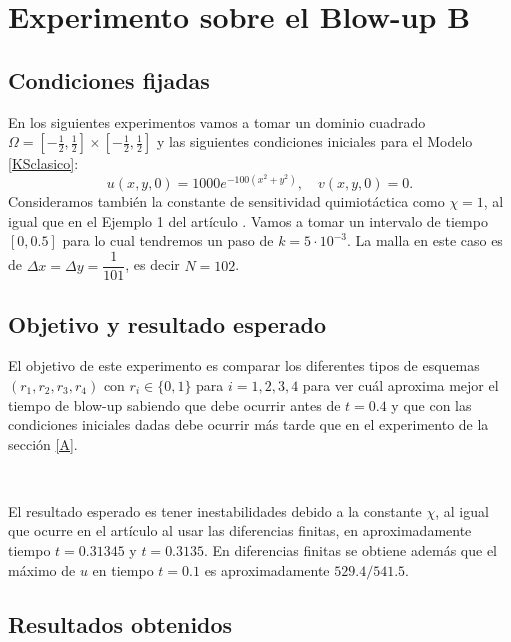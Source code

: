 \documentclass[a4paper,12pt]{article}
\begin{document}
\section{Experimento sobre el Blow-up B}
\subsection{Condiciones fijadas}
En los siguientes experimentos vamos a tomar un dominio cuadrado $\Omega=[-\frac{1}{2},\frac{1}{2}]\times[-\frac{1}{2},\frac{1}{2}]$ y las siguientes condiciones iniciales para el Modelo \ref{KSclasico}:
\begin{equation}
u(x,y,0)=1000e^{-100(x^2+y^2)}, \quad v(x,y,0)=0.
\end{equation}
Consideramos también la constante de sensitividad quimiotáctica como $\chi=1$, al igual que en el Ejemplo 1 del artículo \cite{bib:2}. Vamos a tomar un intervalo de tiempo $[0,0.5]$ para lo cual tendremos un paso de $k=5\cdot 10^{-3}$. 
La malla en este caso es de $\Delta x=\Delta y=\dfrac{1}{101}$, es decir $N=102$. 
\subsection{Objetivo y resultado esperado}
El objetivo de este experimento es comparar los diferentes tipos de esquemas $(r_1,r_2,r_3,r_4)$ con $r_i\in\{0,1\}$ para $i=1,2,3,4$ para ver cuál aproxima mejor el tiempo de blow-up sabiendo que debe ocurrir antes de $t=0.4$ y que con las condiciones iniciales dadas debe ocurrir más tarde que en el experimento de la sección \ref{A}.

\ 

El resultado esperado es tener inestabilidades debido a la constante $\chi$, al igual que ocurre en el artículo al usar las diferencias finitas, en  aproximadamente tiempo $t=0.31345$ y $t=0.3135$. En diferencias finitas se obtiene además que el máximo de $u$ en tiempo $t=0.1$ es aproximadamente $529.4/541.5$.  

\subsection{Resultados obtenidos}
\end{document}
